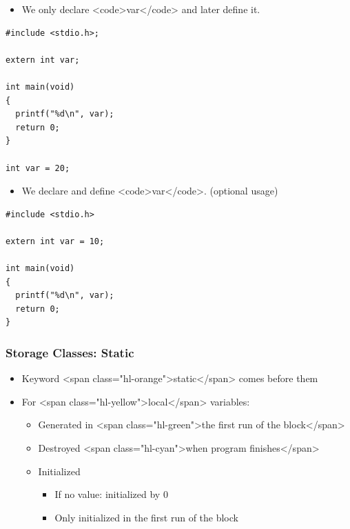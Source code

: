 \documentclass{../c-lecture}
\begin{document}
\begin{frame}[fragile]
  \begin{itemize}
    \item We only declare <code>var</code> and later define it.
  \end{itemize}
  \begin{verbatim}
#include <stdio.h>;

extern int var;

int main(void)
{
  printf("%d\n", var);
  return 0;
}

int var = 20;
  \end{verbatim}
  \begin{itemize}
    \item We declare and define <code>var</code>. (optional usage)
  \end{itemize}
  \begin{verbatim}
#include <stdio.h>

extern int var = 10;

int main(void)
{
  printf("%d\n", var);
  return 0;
}
  \end{verbatim}
\end{frame}

\begin{frame}
  \frametitle{Storage Classes: Static}
  \begin{itemize}
    \item Keyword <span class="hl-orange">static</span> comes before them
    \item For <span class="hl-yellow">local</span> variables:
    \begin{itemize}
      \item
        Generated in
        <span class="hl-green">the first run of the block</span>

      \item Destroyed <span class="hl-cyan">when program finishes</span>
      \item Initialized
      \begin{itemize}
        \item If no value: initialized by 0
        \item Only initialized in the first run of the block
      \end{itemize}
    \end{itemize}
  \end{itemize}
\end{frame}
\end{document}
